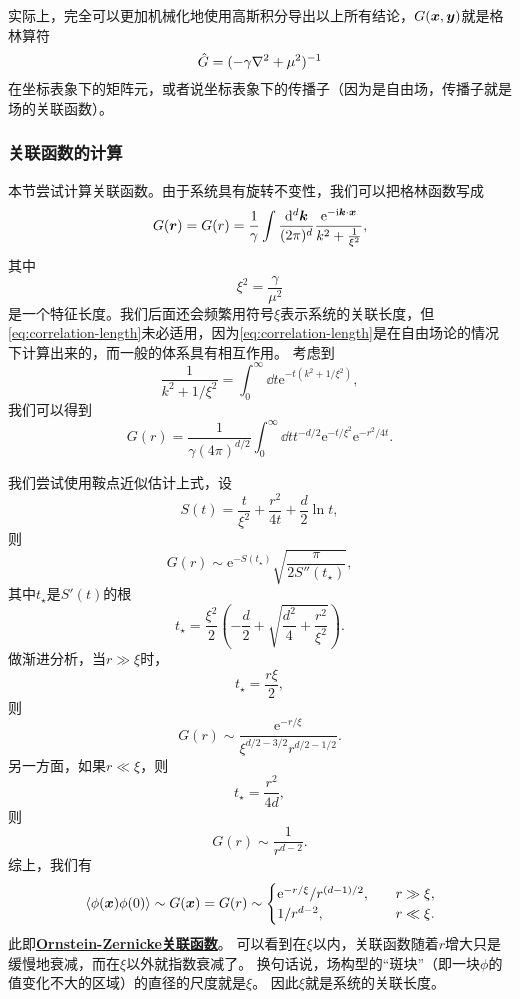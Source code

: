 \documentclass[hyperref, UTF8, a4paper]{ctexart}
\newcommand*{\ii}{\mathrm{i}}
\newcommand*{\ee}{\mathrm{e}}
\newcommand*{\concept}[1]{\underline{\textbf{#1}}}
\begin{document}
实际上，完全可以更加机械化地使用高斯积分导出以上所有结论，$G(\vb*{x}, \vb*{y})$就是格林算符
\[
    \hat{G} = (-\gamma \laplacian + \mu^2)^{-1}
\]
在坐标表象下的矩阵元，或者说坐标表象下的传播子（因为是自由场，传播子就是场的关联函数）。

\subsubsection{关联函数的计算}

本节尝试计算关联函数。由于系统具有旋转不变性，我们可以把格林函数写成
\[
    G(\vb*{r}) = G(r) = \frac{1}{\gamma} \int \frac{\dd[d]{\vb*{k}}}{(2\pi)^d} \frac{\ee^{-\ii \vb*{k} \cdot \vb*{x}}}{k^2 + \frac{1}{\xi^2}},
\]
其中
\begin{equation}
    \xi^2 = \frac{\gamma}{\mu^2}
    \label{eq:correlation-length}
\end{equation}
是一个特征长度。我们后面还会频繁用符号$\xi$表示系统的关联长度，但\eqref{eq:correlation-length}未必适用，因为\eqref{eq:correlation-length}是在自由场论的情况下计算出来的，而一般的体系具有相互作用。
考虑到
\[
    \frac{1}{k^2 + 1/\xi^2} = \int_0^\infty \dd{t} \ee^{-t(k^2 + 1/\xi^2)},
\]
我们可以得到
\begin{equation}
    G(r) = \frac{1}{\gamma (4\pi)^{d/2}} \int_0^\infty \dd{t} t^{-d/2} \ee^{-t/\xi^2} \ee^{-r^2/4t}.
\end{equation}

我们尝试使用鞍点近似估计上式，设
\[
    S(t) = \frac{t}{\xi^2} + \frac{r^2}{4 t} + \frac{d}{2} \ln t,
\]
则
\[
    G(r) \sim \ee^{-S(t_\star)} \sqrt{\frac{\pi}{2 S''(t_\star)}},
\]
其中$t_\star$是$S'(t)$的根
\[
    t_\star = \frac{\xi^2}{2} \left( - \frac{d}{2} + \sqrt{\frac{d^2}{4} + \frac{r^2}{\xi^2}} \right).
\]
做渐进分析，当$r \gg \xi$时，
\[
    t_\star = \frac{r \xi}{2},
\]
则
\[
    G(r) \sim \frac{\ee^{-r/\xi}}{\xi^{d/2-3/2} r^{d/2 - 1/2}}.
\]
另一方面，如果$r \ll \xi$，则
\[
    t_\star = \frac{r^2}{4d},
\]
则
\[
    G(r) \sim \frac{1}{r^{d-2}}.
\]
综上，我们有
\begin{equation}
    \expval*{\phi(\vb*{x}) \phi(0)} \sim G(\vb*{x}) = G(r) \sim \begin{cases}
        \ee^{-r/\xi} / r^{(d-1)/2}, \quad &r \gg \xi, \\
        1/r^{d-2}, \quad &r \ll \xi.
    \end{cases}
\end{equation}
此即\concept{Ornstein-Zernicke关联函数}。
可以看到在$\xi$以内，关联函数随着$r$增大只是缓慢地衰减，而在$\xi$以外就指数衰减了。
换句话说，场构型的“斑块”（即一块$\phi$的值变化不大的区域）的直径的尺度就是$\xi$。
因此$\xi$就是系统的关联长度。
\end{document}
